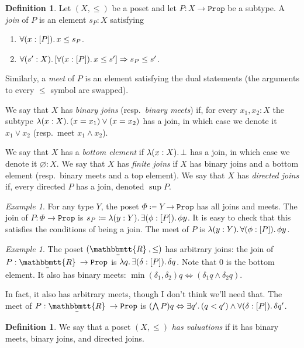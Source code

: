 \documentclass[11pt, oneside, article]{memoir}
\theoremstyle{plain}
\theoremstyle{definition}
\newtheorem{definition}[theorem]{Definition}
\theoremstyle{remark}
\newtheorem{example}[theorem]{Example}
\DeclarePairedDelimiter{\subtype}{[}{]}
\newcommand{\const}[1]{\mathtt{#1}}
\newcommand{\ubar}[1]{\underaccent{\bar}{#1}}
\newcommand{\internal}[1]{\raisebox{-.03ex}{$\mathbbmtt{#1}$}}
\newcommand{\hs}{\hspace{1.1pt}}
\newcommand{\tRR}{\internal{R}\hs}
\newcommand{\tLR}{\ubar{\tRR}\hs}
\newcommand{\Prop}{\const{Prop}}
\newcommand{\imp}{\Rightarrow}
\renewcommand{\iff}{\Leftrightarrow}
\begin{document}
\begin{definition}
Let $(X,\leq)$ be a poset and let $P:X\to\Prop$ be a subtype. A \emph{join} of $P$ is an element $s_P:X$ satisfying
\begin{enumerate}
	\item $\forall(x:\subtype{P})\ldotp x\leq s_P$.
	\item $\forall(s':X)\ldotp[\forall(x:\subtype{P})\ldotp x\leq s']\imp s_P\leq s'$.
\end{enumerate}
Similarly, a \emph{meet} of $P$ is an element satisfying the dual statements (the arguments to every $\leq$ symbol are swapped).

We say that $X$ has \emph{binary joins} (resp.\ \emph{binary meets}) if, for every $x_1,x_2:X$ the subtype $\lambda(x:X)\ldotp (x=x_1) \vee (x=x_2)$ has a join, in which case we denote it $x_1\vee x_2$ (resp.\ meet $x_1\wedge x_2$). 

We say that $X$ has a \emph{bottom element} if $\lambda(x:X)\ldotp \bot$ has a join, in which case we denote it $\varnothing:X$. We say that $X$ has \emph{finite joins} if $X$ has binary joins and a bottom element (resp.\ binary meets and a top element). We say that $X$ has \emph{directed joins} if, every directed $P$ has a join, denoted $\sup P$.
\end{definition}

\begin{example}
For any type $Y$, the poset $\Phi\coloneqq Y\to\Prop$ has all joins and meets. The join of $P:\Phi\to\Prop$ is $s_P\coloneqq\lambda(y:Y)\ldotp\exists(\phi:\subtype{P})\ldotp\phi y$. It is easy to check that this satisfies the conditions of being a join. The meet of $P$ is $\lambda(y:Y)\ldotp\forall(\phi:\subtype{P})\ldotp\phi y$.
\end{example}

\begin{example}
The poset $(\tLR,\leq)$ has arbitrary joins: the join of $P:\tLR\to\Prop$ is $\lambda q\ldotp\exists(\delta:\subtype{P})\ldotp\delta q$. Note that $0$ is the bottom element. It also has binary meets: $\min(\delta_1,\delta_2)q\iff(\delta_1 q\wedge \delta_2q)$.

In fact, it also has arbitrary meets, though I don't think we'll need that. The meet of $P:\tLR\to\Prop$ is $(\bigwedge P)q\iff\exists q'\ldotp (q<q')\wedge\forall(\delta:\subtype{P})\ldotp\delta q'$.
\end{example}

\begin{definition}
We say that a poset $(X,\leq)$ \emph{has valuations} if it has binary meets, binary joins, and directed joins.
\end{definition}
\end{document}
